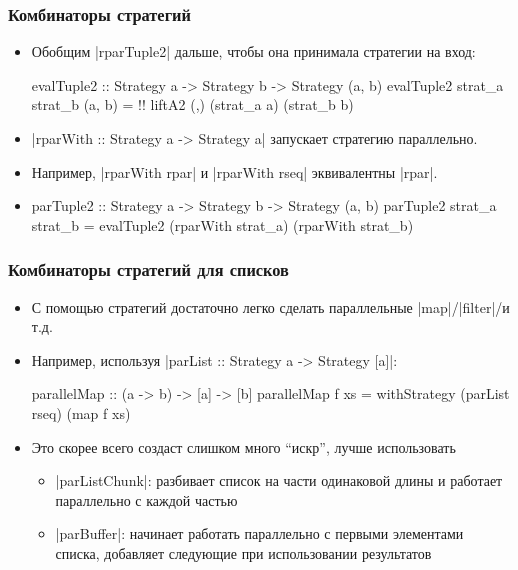\documentclass[11pt]{beamer}
\begin{document}
\begin{frame}[fragile]
  \frametitle{Комбинаторы стратегий}
  \begin{itemize}
    \item Обобщим \haskinline|rparTuple2| дальше, чтобы она принимала стратегии на вход:
          \begin{haskell}
            evalTuple2 :: Strategy a -> Strategy b -> 
              Strategy (a, b)
            evalTuple2 strat_a strat_b (a, b) = !\pause! 
              liftA2 (,) (strat_a a) (strat_b b)
          \end{haskell}
          \pause
    \item \haskinline|rparWith :: Strategy a -> Strategy a| запускает стратегию параллельно.
    \item Например, \haskinline|rparWith rpar| и \haskinline|rparWith rseq| эквивалентны \haskinline|rpar|.
          \pause
    \item
          \begin{haskell}
            parTuple2 :: Strategy a -> Strategy b -> 
              Strategy (a, b)
            parTuple2 strat_a strat_b = 
              evalTuple2 (rparWith strat_a) (rparWith strat_b)
          \end{haskell}
  \end{itemize}
\end{frame}

\begin{frame}[fragile]
  \frametitle{Комбинаторы стратегий для списков}
  \begin{itemize}
    \item С помощью стратегий достаточно легко сделать параллельные \haskinline|map|/\haskinline|filter|/и т.д.
    \item Например, используя \haskinline|parList :: Strategy a -> Strategy [a]|:
          \begin{haskell}
            parallelMap :: (a -> b) -> [a] -> [b]
            parallelMap f xs = 
              withStrategy (parList rseq) (map f xs)
          \end{haskell}
          \pause
    \item Это скорее всего создаст слишком много \enquote{искр}, лучше использовать
          \begin{itemize}
            \item \haskinline|parListChunk|: разбивает список на части одинаковой длины и работает параллельно с каждой частью
            \item \haskinline|parBuffer|: начинает работать параллельно с первыми элементами списка, добавляет следующие при использовании результатов
          \end{itemize}
  \end{itemize}
\end{frame}
\end{document}
